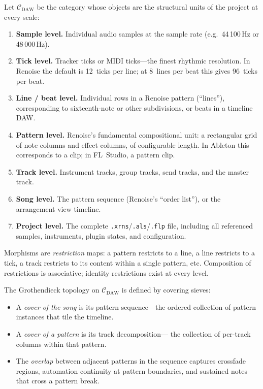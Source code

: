 \begin{definition}
\label{def:musical-site}
Let $\mathcal{C}_{\mathrm{DAW}}$ be the category whose objects are
the structural units of the project at every scale:
\begin{enumerate}
  \item \textbf{Sample level.}\;
        Individual audio samples at the sample rate
        (e.g.\ 44\,100\,Hz or 48\,000\,Hz).
  \item \textbf{Tick level.}\;
        Tracker ticks or MIDI ticks---the finest rhythmic
        resolution.  In Renoise the default is 12~ticks per line;
        at 8~lines per beat this gives 96~ticks per beat.
  \item \textbf{Line / beat level.}\;
        Individual rows in a Renoise pattern (``lines''),
        corresponding to sixteenth-note or other subdivisions,
        or beats in a timeline DAW.
  \item \textbf{Pattern level.}\;
        Renoise's fundamental compositional unit: a rectangular
        grid of note columns and effect columns, of configurable
        length.  In Ableton this corresponds to a clip; in
        FL~Studio, a pattern clip.
  \item \textbf{Track level.}\;
        Instrument tracks, group tracks, send tracks, and the
        master track.
  \item \textbf{Song level.}\;
        The pattern sequence (Renoise's ``order list''), or the
        arrangement view timeline.
  \item \textbf{Project level.}\;
        The complete \texttt{.xrns}/\texttt{.als}/\texttt{.flp}
        file, including all referenced samples, instruments,
        plugin states, and configuration.
\end{enumerate}
Morphisms are \emph{restriction} maps: a pattern restricts to a
line, a line restricts to a tick, a track restricts to its content
within a single pattern, etc.  Composition of restrictions is
associative; identity restrictions exist at every level.
\end{definition}

The Grothendieck topology on $\mathcal{C}_{\mathrm{DAW}}$ is
defined by covering sieves:

\begin{itemize}
  \item A \emph{cover of the song} is its pattern sequence---the
        ordered collection of pattern instances that tile the
        timeline.
  \item A \emph{cover of a pattern} is its track decomposition---
        the collection of per-track columns within that pattern.
  \item The \emph{overlap} between adjacent patterns in the
        sequence captures crossfade regions, automation
        continuity at pattern boundaries, and sustained notes
        that cross a pattern break.
\end{itemize}

